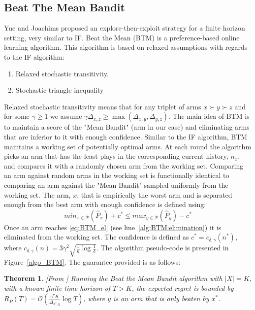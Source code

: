 \documentclass[MSc,beforeExam]{iitcsthesis}
\newtheorem{theorem}{Theorem}
\begin{document}
\newpage
\subsection{Beat The Mean Bandit}
	Yue and Joachims \cite{yue2011beat} proposed an explore-then-exploit strategy for a finite horizon setting, very similar to IF. 
	Beat the Mean (BTM) is a preference-based online learning algorithm.
	This algorithm is based on relaxed assumptions with regards to the IF algorithm:
	\begin{enumerate}
		\item Relaxed stochastic transitivity.
		\item Stochastic triangle inequality
	\end{enumerate}
	Relaxed stochastic transitivity means that for any triplet of arms $x \succ y \succ z$ and for some $\gamma \geq 1$ we assume $\gamma\Delta_{x,z} \geq \max(\Delta_{x,y},\Delta_{y,z})$.
	The main idea of BTM is to maintain a score of the "Mean Bandit" (arm in our case) and eliminating arms that are inferior to it with enough confidence.
	Similar to the IF algorithm, BTM maintains a working set of potentially optimal arms.
	At each round the algorithm picks an arm that has the least plays in the corresponding current history, $n_x$, and compares it with a randomly chosen arm from the working set.
	Comparing an arm against random arms in the working set is functionally identical to comparing an arm against the "Mean Bandit" sampled uniformly from the working set.
	The arm, $x$, that is empirically the worst arm and is separated enough from the best arm with enough confidence is defined using:
	\begin{equation}\label{eq:BTM_el}
	min_{x\in \mathcal{P}} (\hat{P}_{x})+c^* \leq max_{y \in \mathcal{P}}(\hat{P}_{y})-c^*
\end{equation}	 
	Once an arm reaches \eqref{eq:BTM_el} (see line~\ref{alg:BTM:elimination}) it is eliminated from the working set. The confidence is defined as $ c^* = c_{\delta, \gamma}(n^*) $, where $c_{\delta, \gamma}(n) = 3\gamma^2 \sqrt{\frac{1}{n}\log \frac{1}{\delta}}$.
	The algorithm pseudo-code is presented in Figure~\ref{algo_BTM}.	
	The guarantee provided is as follows:
	\begin{theorem}\label{thm:BTM}[From \cite{yue2011beat}]
		Running the Beat the Mean Bandit algorithm with $|X|=K$, with a known finite time horizon of $T>K$, the expected regret is bounded by $R_P(T) = \mathcal{O} \left( \frac{\gamma^7K}{\Delta_{x^*,y}} \log T \right)$, where $y$ is an arm that is only beaten by $x^*$.

	\end{theorem}
	
\end{document}
